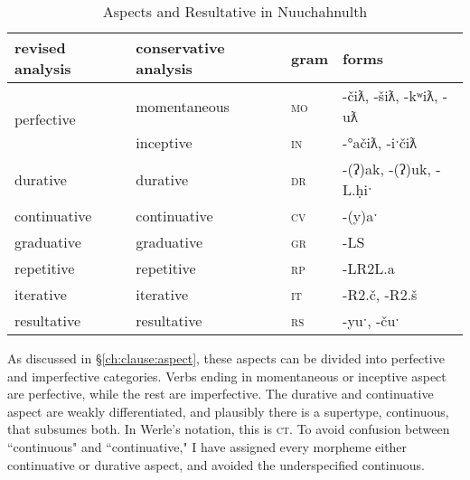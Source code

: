 \begin{table}[ht]
\centering
\caption{Aspects and Resultative in Nuuchahnulth}
\label{table:aspects}
\begin{tabular}{llll}
revised analysis & conservative analysis & gram                    & forms                                                         \\ \hline
\multicolumn{1}{|l|}{\multirow{2}{*}{perfective}}   & \multicolumn{1}{l|}{momentaneous} & \multicolumn{1}{l|}{\textsc{mo}} & \multicolumn{1}{l|}{-čiƛ, -šiƛ, -kʷiƛ, -uƛ}                 \\ \cline{2-4} 
\multicolumn{1}{|l|}{}                            & \multicolumn{1}{l|}{inceptive}    & \multicolumn{1}{l|}{\textsc{in}} & \multicolumn{1}{l|}{-°ačiƛ, -iˑčiƛ}                         \\ \hline
\multicolumn{1}{|l|}{durative}                    & \multicolumn{1}{l|}{durative}     & \multicolumn{1}{l|}{\textsc{dr}} & \multicolumn{1}{l|}{-(ʔ)ak, -(ʔ)uk, -L.ḥiˑ}  \\ \hline
\multicolumn{1}{|l|}{continuative}                & \multicolumn{1}{l|}{continuative} & \multicolumn{1}{l|}{\textsc{cv}} & \multicolumn{1}{l|}{-(y)aˑ}                   \\ \hline
\multicolumn{1}{|l|}{graduative}                     & \multicolumn{1}{l|}{graduative}   & \multicolumn{1}{l|}{\textsc{gr}} & \multicolumn{1}{l|}{-LS}                        \\ \hline
\multicolumn{1}{|l|}{repetitive}                  & \multicolumn{1}{l|}{repetitive}   & \multicolumn{1}{l|}{\textsc{rp}} & \multicolumn{1}{l|}{-LR2L.a}                   \\ \hline
\multicolumn{1}{|l|}{iterative}                  & \multicolumn{1}{l|}{iterative}    & \multicolumn{1}{l|}{\textsc{it}} & \multicolumn{1}{l|}{-R2.č, -R2.š} \\ \hline \hline
\multicolumn{1}{|l|}{resultative}                 & \multicolumn{1}{l|}{resultative}  & \multicolumn{1}{l|}{\textsc{rs}} & \multicolumn{1}{l|}{-yuˑ, -čuˑ}              \\ \hline
\end{tabular}
\end{table}

As discussed in \S\ref{ch:clause:aspect}, these aspects can be divided into perfective and imperfective categories. Verbs ending in momentaneous or inceptive aspect are perfective, while the rest are imperfective. The durative and continuative aspect are weakly differentiated, and plausibly there is a supertype, continuous, that subsumes both. In Werle's notation, this is \textsc{ct}. To avoid confusion between ``continuous" and ``continuative," I have assigned every morpheme either continuative or durative aspect, and avoided the underspecified continuous.


